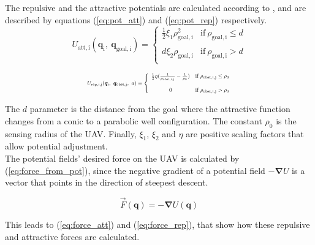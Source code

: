 \documentclass[journal, twoside]{IEEEtran}
\newcommand*{\subb}[1]{_{\mathrm{#1}}}
\begin{document}
		The repulsive and the attractive potentials are calculated according to \cite{potfieldsmethod}, and are described by equations (\ref{eq:pot_att}) and (\ref{eq:pot_rep}) respectively.
		\begin{equation} \label{eq:pot_att}
		U\subb{att, i}(\bm{q}\subb{i}, \ \bm{q}\subb{goal, i}) =  \left\lbrace  {\begin{array}{cc}
			\frac{1}{2} \xi\subb{1} \rho\subb{goal, i}^2& \textrm{if} \ \rho\subb{goal, i}\leq d \\
			\\
			d \xi\subb{2} \rho\subb{goal, i} &\textrm{if} \ \rho\subb{goal, i}> d \\
			\end{array} } \right.
		\end{equation}
		
		\begin{equation} \label{eq:pot_rep}
		\resizebox{0.5\textwidth}{!}{ $
		U\subb{rep, i,j}(\bm{q}\subb{i}, \ \bm{q}\subb{obst, j},\ a) =  \left\lbrace  {\begin{array}{cc}
			\frac{1}{2} \eta (\frac{1}{\rho\subb{obst,i,j}} - \frac{1}{\rho\subb{0}}) &\textrm{if} \ \rho\subb{obst,i,j}\leq \rho\subb{0} \\
			\\
			0 &\textrm{if} \ \rho\subb{obst,i,j}> \rho\subb{0} \\
			\end{array} } \right. $}
		\end{equation}		
		
		The $d$ parameter is the distance from the goal where the attractive function changes from a conic to a parabolic well configuration. The constant $\rho\subb{0}$ is the sensing radius of the UAV. Finally, $\xi\subb{1}$, $\xi\subb{2}$ and $\eta$ are positive scaling factors that allow potential adjustment. \\
		
		The potential fields' desired force on the UAV is calculated by (\ref{eq:force_from_pot}), since the negative gradient of a potential field $-\bm{\nabla} U$ is a vector that points in the direction of steepest descent. 
		
		\begin{equation} \label{eq:force_from_pot}
		\vec{F}(\bm{q}) = - \bm{\nabla} U(\bm{q})
		\end{equation}
		
		This leads to (\ref{eq:force_att}) and (\ref{eq:force_rep}), that show how these repulsive and attractive forces are calculated.
		
\end{document}
